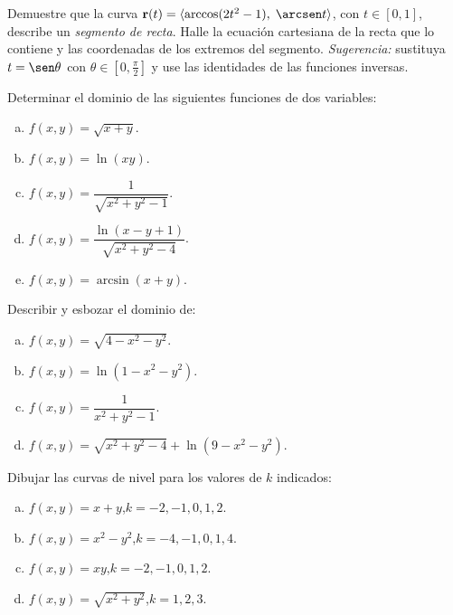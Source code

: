 \begin{prob}
Demuestre que la curva
$\mathbf{r}(t)=\langle \arccos(2t^2-1),\; \arcsen t\rangle$, con
$t\in[0,1]$, describe un \emph{segmento de recta}. Halle la ecuación
cartesiana de la recta que lo contiene y las coordenadas de los extremos del
segmento. \emph{Sugerencia:} sustituya $t=\sen\theta$ con
$\theta\in[0,\tfrac{\pi}{2}]$ y use las identidades de las funciones inversas.
\end{prob}

\begin{prob}
Determinar el dominio de las siguientes funciones de dos variables:
\begin{enumerate}[a)]
  \item $f(x,y) = \sqrt{x+y}$.
  \item $f(x,y) = \ln(xy)$.
  \item $f(x,y) = \dfrac{1}{\sqrt{x^2 + y^2 - 1}}$.
  \item $f(x,y) = \dfrac{\ln(x-y+1)}{\sqrt{x^2+y^2-4}}$.
  \item $f(x,y) = \arcsin(x+y)$.
\end{enumerate}
\end{prob}

\begin{prob}
Describir y esbozar el dominio de:
\begin{enumerate}[a)]
  \item $f(x,y) = \sqrt{4 - x^2 - y^2}$.
  \item $f(x,y) = \ln(1 - x^2 - y^2)$.
  \item $f(x,y) = \dfrac{1}{x^2 + y^2 - 1}$.
  \item $f(x,y) = \sqrt{x^2 + y^2 - 4} + \ln(9 - x^2 - y^2)$.
\end{enumerate}
\end{prob}


\begin{prob}
Dibujar las curvas de nivel para los valores de $k$ indicados:
\begin{enumerate}[a)]
  \item $f(x,y) = x + y$,\quad $k = -2, -1, 0, 1, 2$.
  \item $f(x,y) = x^2 - y^2$,\quad $k = -4, -1, 0, 1, 4$.
  \item $f(x,y) = xy$,\quad $k = -2, -1, 0, 1, 2$.
  \item $f(x,y) = \sqrt{x^2 + y^2}$,\quad $k = 1, 2, 3$.
\end{enumerate}
\end{prob}

